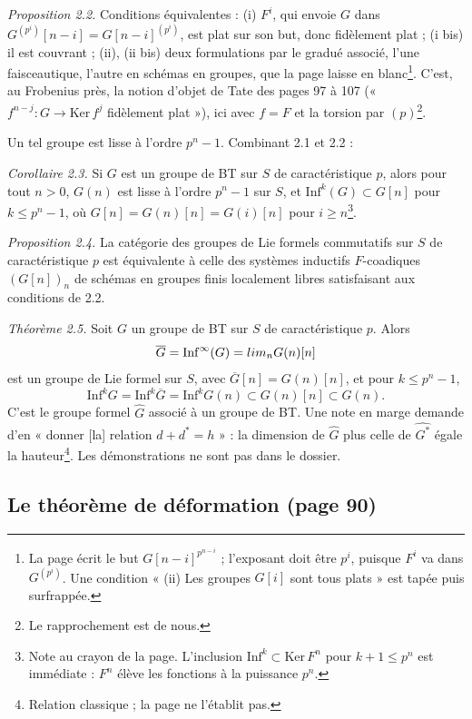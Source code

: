 \documentclass[11pt,a4paper]{article}
\begin{document}
\emph{Proposition 2.2.} Conditions équivalentes : (i) $F^{i}$, qui envoie
$G$ dans $G^{(p^{i})}[n-i] = G[n-i]^{(p^{i})}$, est plat sur son but,
donc fidèlement plat ; (i bis) il est couvrant ; (ii), (ii bis) deux
formulations par le gradué associé, l'une faisceautique, l'autre en
schémas en groupes, que la page laisse en blanc\footnote{La page écrit
le but $G[n-i]^{p^{n-i}}$ ; l'exposant doit être $p^{i}$, puisque $F^{i}$
va dans $G^{(p^{i})}$. Une condition « (ii) Les groupes $G[i]$ sont tous
plats » est tapée puis surfrappée.}. C'est, au Frobenius près, la notion
d'objet de Tate des pages 97 à 107 (« $f^{n-j} \colon G \to
\mathrm{Ker}\, f^{j}$ fidèlement plat »), ici avec $f = F$ et la torsion
par $(p)$\footnote{Le rapprochement est de nous.}.

Un tel groupe est lisse à l'ordre $p^{n} - 1$. Combinant 2.1 et 2.2 :

\emph{Corollaire 2.3.} Si $G$ est un groupe de BT sur $S$ de
caractéristique $p$, alors pour tout $n > 0$, $G(n)$ est lisse à l'ordre
$p^{n} - 1$ sur $S$, et $\mathrm{Inf}^{k}(G) \subset G[n]$ pour
$k \leq p^{n} - 1$, où $G[n] = G(n)[n] = G(i)[n]$ pour $i \geq
n$\footnote{Note au crayon de la page. L'inclusion
$\mathrm{Inf}^{k} \subset \mathrm{Ker}\, F^{n}$ pour $k + 1 \leq p^{n}$
est immédiate : $F^{n}$ élève les fonctions à la puissance $p^{n}$.}.

\emph{Proposition 2.4.} La catégorie des groupes de Lie formels
commutatifs sur $S$ de caractéristique $p$ est équivalente à celle des
systèmes inductifs $F$-coadiques $(G[n])_n$ de schémas en groupes finis
localement libres satisfaisant aux conditions de 2.2.

\emph{Théorème 2.5.} Soit $G$ un groupe de BT sur $S$ de caractéristique
$p$. Alors
\[
\overline{G} = \mathrm{Inf}^{\infty}(G) = \varinjlim_n G(n)[n]
\]
est un groupe de Lie formel sur $S$, avec $\overline{G}[n] = G(n)[n]$,
et pour $k \leq p^{n} - 1$,
\[
\mathrm{Inf}^{k} G = \mathrm{Inf}^{k} \overline{G} = \mathrm{Inf}^{k} G(n)
\subset G(n)[n] \subset G(n).
\]
C'est le groupe formel $\widehat{G}$ associé à un groupe de BT. Une note
en marge demande d'en « donner [la] relation $d + d^{*} = h$ » : la
dimension de $\widehat{G}$ plus celle de $\widehat{G^{*}}$ égale la
hauteur\footnote{Relation classique ; la page ne l'établit pas.}. Les
démonstrations ne sont pas dans le dossier.

\subsection*{Le théorème de déformation (page 90)}
\end{document}
